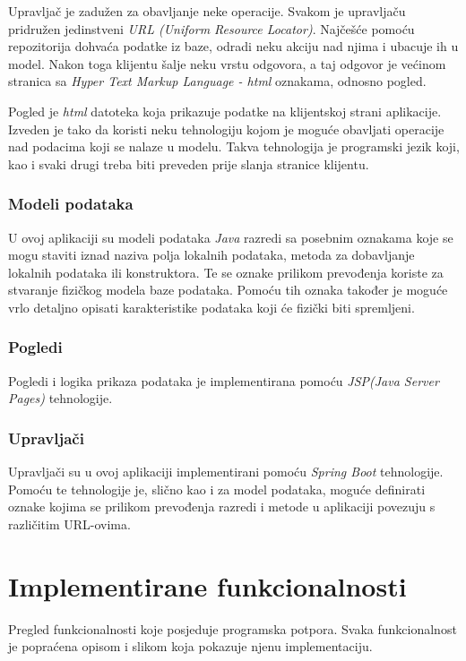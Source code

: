 \documentclass[zavrsni, numeric]{fer}
\begin{document}
Upravljač je zadužen za obavljanje neke operacije. Svakom je upravljaču pridružen jedinstveni \textit{URL (Uniform Resource Locator)}. Najčešće pomoću repozitorija dohvaća podatke iz baze, odradi neku akciju nad njima i ubacuje ih u model. Nakon toga klijentu šalje neku vrstu odgovora, a taj odgovor je većinom stranica sa \textit{Hyper Text Markup Language - html} oznakama, odnosno pogled.

Pogled je \textit{html} datoteka koja prikazuje podatke na klijentskoj strani aplikacije. Izveden je tako da koristi neku tehnologiju kojom je moguće obavljati operacije nad podacima koji se nalaze u modelu. Takva tehnologija je programski jezik koji, kao i svaki drugi treba biti preveden prije slanja stranice klijentu. 

\subsection{Modeli podataka}
U ovoj aplikaciji su modeli podataka \textit{Java} razredi sa posebnim oznakama koje se mogu staviti iznad naziva polja lokalnih podataka, metoda za dobavljanje lokalnih podataka ili konstruktora. Te se oznake prilikom prevođenja koriste za stvaranje fizičkog modela baze podataka. Pomoću tih oznaka također je moguće vrlo detaljno opisati karakteristike podataka koji će fizički biti spremljeni. 

\subsection{Pogledi}
Pogledi i logika prikaza podataka je implementirana pomoću \textit{JSP(Java Server Pages)} tehnologije.

\subsection{Upravljači}
Upravljači su u ovoj aplikaciji implementirani pomoću \textit{Spring Boot} tehnologije. Pomoću te tehnologije je, slično kao i za model podataka, moguće definirati oznake kojima se prilikom prevođenja razredi i metode u aplikaciji povezuju s različitim URL-ovima.

\chapter{Implementirane funkcionalnosti}
Pregled funkcionalnosti koje posjeduje programska potpora. Svaka funkcionalnost je popraćena opisom i slikom koja pokazuje njenu implementaciju.
\end{document}
